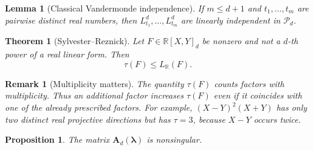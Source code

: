 \documentclass[10pt,a4paper]{amsart}
\newtheorem{lemma}{Lemma}
\newtheorem{theorem}{Theorem}
\newtheorem{remark}{Remark}
\newtheorem{proposition}{Proposition}
\newcommand{\LR}{L_{\RR}}
\newcommand{\Mat}[1]{\mathbf{#1}}
\newcommand{\RR}{\mathbb{R}}
\newcommand{\cP}{\mathcal{P}}
\newcommand{\vct}[1]{\boldsymbol{#1}}
\begin{document}
\begin{lemma}[Classical Vandermonde independence]\label{lem:pure-power-independence}
If \(m\le d+1\) and \(t_1,\ldots,t_m\) are pairwise distinct real
numbers, then \(L_{t_1}^d,\ldots,L_{t_m}^d\) are linearly independent in
\(\cP_d\).
\end{lemma}

\begin{theorem}[Sylvester--Reznick]\label{thm:reznick}
Let \(F\in\RR[X,Y]_d\) be nonzero and not a \(d\)-th power of a real
linear form.  Then
\[
 \tau(F)\le \LR(F).
\]
\end{theorem}

\begin{remark}[Multiplicity matters]\label{rem:multiplicity}
The quantity \(\tau(F)\) counts factors with multiplicity.  Thus an
additional factor increases \(\tau(F)\) even if it coincides with one of
the already prescribed factors.  For example,
\((X-Y)^2(X+Y)\) has only two distinct real projective directions but
has \(\tau=3\), because \(X-Y\) occurs twice.
\end{remark}

\begin{proposition}\label{prop:odd-nonsingular}
The matrix \(\Mat{A}_d(\vct{\lambda})\) is nonsingular.
\end{proposition}
\end{document}
